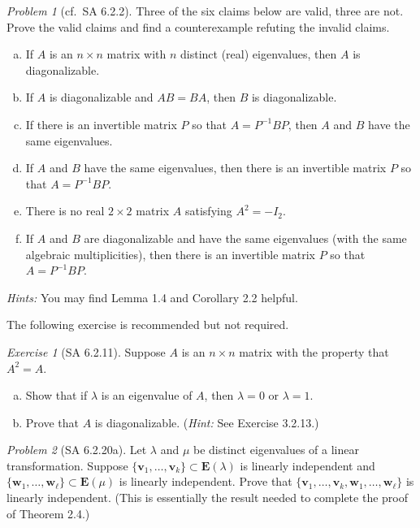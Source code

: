 \documentclass[fleqn,11pt]{paper}
\theoremstyle{remark}
\newtheorem{problem}{Problem}
\newtheorem*{solution}{{\bf Solution}}
\newtheorem*{ex}{Exercise}
\renewcommand{\vec}[1]{\mathbf{#1}}
\newcommand{\<}{\ensuremath{\langle}}
\renewcommand{\>}{\ensuremath{\rangle}}
\newcommand\vv{\vec{v}}
\newcommand\vw{\vec{w}}
\begin{document}
\begin{problem}[cf.~SA 6.2.2]
Three of the six claims below are valid, three are not.
Prove the valid claims and find a counterexample refuting the invalid claims.
\begin{enumerate}[a.]
\item If $A$ is an $n \times n$ matrix with $n$ distinct (real) eigenvalues,
  then $A$ is diagonalizable.
\item If $A$ is diagonalizable and $AB = BA$, then $B$ is diagonalizable.
\item If there is an invertible matrix $P$ so that $A = P^{-1}BP$, then $A$ and
  $B$ have the same eigenvalues.
\item If $A$ and $B$ have the same eigenvalues, then there is an invertible matrix $P$ so that
$A = P^{-1}BP$.
\item There is no real $2 \times 2$ matrix $A$ satisfying $A^2 = -I_2$.
\item If $A$ and $B$ are diagonalizable and have the same eigenvalues (with the same algebraic
multiplicities), then there is an invertible matrix $P$ so that $A = P^{-1}BP$.
\end{enumerate}
{\it Hints:} You may find Lemma 1.4 and Corollary 2.2 helpful. 
\end{problem}
\newpage

\noindent The following exercise is recommended but not required.
\begin{ex}[SA 6.2.11]
Suppose $A$ is an $n \times n$ matrix with the property that $A^2 = A$.
\begin{enumerate}[a.]
\item Show that if $\lambda$ is an eigenvalue of $A$, then $\lambda = 0$ or $\lambda = 1$.
\item Prove that $A$ is diagonalizable. ({\it Hint:} See Exercise 3.2.13.)
\end{enumerate}
\end{ex}
\newpage

\begin{problem}[SA 6.2.20a]
Let $\lambda$ and $\mu$ be distinct eigenvalues of a linear
transformation. Suppose 
$\{\vv_1,\dots, \vv_k\} \subset \mathbf{E}(\lambda)$
is linearly independent and 
$\{\vw_1,\dots, \vw_\ell\} \subset \mathbf{E}(\mu)$
is linearly independent.
Prove that $\{\vv_1,\dots, \vv_k, \vw_1,\dots, \vw_\ell\}$ is linearly
independent. (This is essentially the result needed
to complete the proof of Theorem 2.4.)
\end{problem}
\newpage
\end{document}
